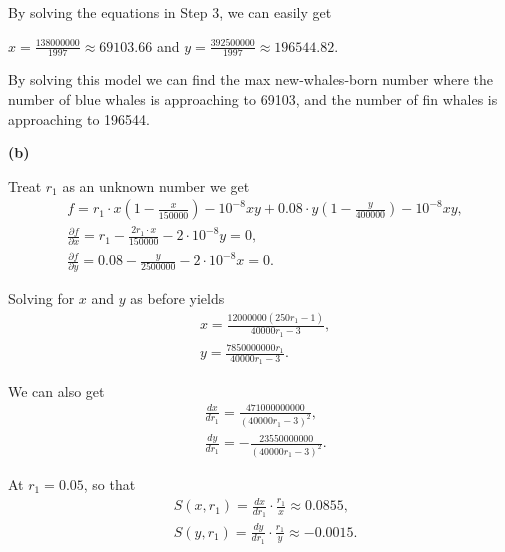 \documentclass{report}
\begin{document}
\vspace{1em}
\hspace{-1.5em}{\bf Step 4. Solve the model}\par
By solving the equations in Step 3, we can easily get
\par $x = \frac{138000000}{1997} \approx 69103.66$ and 
$y = \frac{392500000}{1997} \approx 196544.82$.

\vspace{1em}
\hspace{-1.5em}{\bf Step 5. Answer the question}\par
By solving this model we can find the max new-whales-born number where 
the number of blue whales is approaching to 69103, and the number of fin whales is approaching to 196544.

\newpage
\vspace{2.em}

\noindent
{\bf (b)}\par
\vspace{1.em}
\hspace{-1.5em}{\bf Sensitivity analysis}\par
Treat $r_1$ as an unknown number we get
\begin{align*}
    &f=r_1 \cdot x(1-\frac{x}{150000})-10^{-8} xy + 0.08\cdot y(1-\frac{y}{400000})-10^{-8} xy,\\
    &\frac{\partial f}{\partial x}=r_1 -\frac{2r_1\cdot x}{150000}-2\cdot 10^{-8}y=0,\\
    &\frac{\partial f}{\partial y}=0.08-\frac{y}{2500000}-2\cdot 10^{-8}x=0.
\end{align*}
\par
Solving for $x$ and $y$ as before yields
\begin{align*}
    &x=\frac{12000000(250r_1 -1)}{40000r_1 -3},\\
    &y=\frac{7850000000r_1}{40000r_1 -3}.
\end{align*}
\par We can also get
\begin{align*}
    &\frac{dx}{dr_1}=\frac{471000000000}{{(40000r_1 -3)}^2},\\
    &\frac{dy}{dr_1}=-\frac{23550000000}{{(40000r_1 -3)}^2}.
\end{align*}
\par At $r_1 = 0.05$, so that 
\begin{align*}
    &S(x,r_1)=\frac{dx}{dr_1}\cdot \frac{r_1}{x}\approx 0.0855,\\
    &S(y,r_1)=\frac{dy}{dr_1}\cdot \frac{r_1}{y}\approx -0.0015.
\end{align*}
\end{document}
